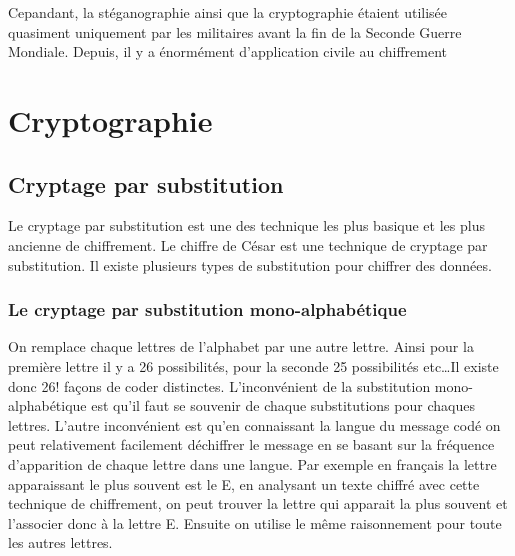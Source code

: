 \documentclass[a4paper,12pt]{article}
\begin{document}
	Cepandant, la stéganographie ainsi que la cryptographie étaient utilisée quasiment uniquement par les militaires avant la fin de la Seconde Guerre Mondiale. Depuis, il y a énormément d'application civile au chiffrement
		\section{Cryptographie}
			\subsection{Cryptage par substitution}
	Le cryptage par substitution  est une des technique les plus basique et les plus ancienne de chiffrement. Le chiffre de César est une technique de cryptage par substitution. Il existe plusieurs types de substitution pour chiffrer des données.

	\subsubsection{Le cryptage par substitution mono-alphabétique}
	On remplace chaque lettres de l'alphabet par une autre lettre. Ainsi pour la première lettre il y a 26 possibilités, pour la seconde 25 possibilités etc\dots Il existe donc 26! façons de coder distinctes. L'inconvénient de la substitution mono-alphabétique est qu'il faut se souvenir de chaque substitutions pour chaques lettres. L'autre inconvénient est qu'en connaissant la langue du message codé on peut relativement facilement déchiffrer le message en se basant sur la fréquence d'apparition de chaque lettre dans une langue. Par exemple en français la lettre apparaissant le plus souvent est le E, en analysant un texte chiffré avec cette technique de chiffrement, on peut trouver la lettre qui apparait la plus souvent et l'associer donc à la lettre E. Ensuite on utilise le même raisonnement pour toute les autres lettres.
\end{document}
